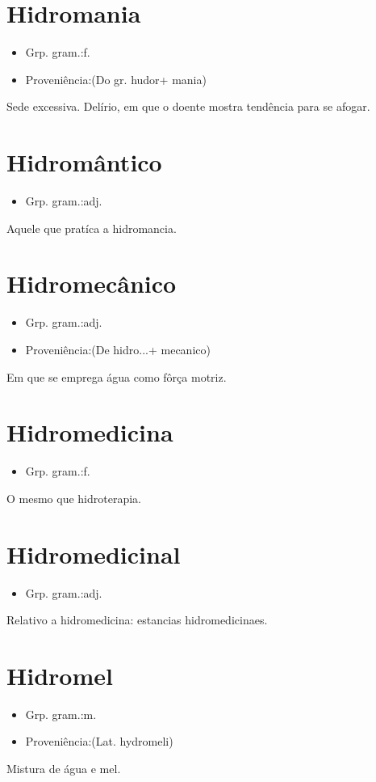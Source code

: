 \documentclass{article}
\begin{document}
\section{Hidromania}
\begin{itemize}
\item {Grp. gram.:f.}
\end{itemize}
\begin{itemize}
\item {Proveniência:(Do gr. \textunderscore hudor\textunderscore  + \textunderscore mania\textunderscore )}
\end{itemize}
Sede excessiva.
Delírio, em que o doente mostra tendência para se afogar.
\section{Hidromântico}
\begin{itemize}
\item {Grp. gram.:adj.}
\end{itemize}
Aquele que pratíca a hidromancia.
\section{Hidromecânico}
\begin{itemize}
\item {Grp. gram.:adj.}
\end{itemize}
\begin{itemize}
\item {Proveniência:(De \textunderscore hidro...\textunderscore  + \textunderscore mecanico\textunderscore )}
\end{itemize}
Em que se emprega água como fôrça motriz.
\section{Hidromedicina}
\begin{itemize}
\item {Grp. gram.:f.}
\end{itemize}
O mesmo que \textunderscore hidroterapia\textunderscore .
\section{Hidromedicinal}
\begin{itemize}
\item {Grp. gram.:adj.}
\end{itemize}
Relativo a hidromedicina: \textunderscore estancias hidromedicinaes\textunderscore .
\section{Hidromel}
\begin{itemize}
\item {Grp. gram.:m.}
\end{itemize}
\begin{itemize}
\item {Proveniência:(Lat. \textunderscore hydromeli\textunderscore )}
\end{itemize}
Mistura de água e mel.
\end{document}

